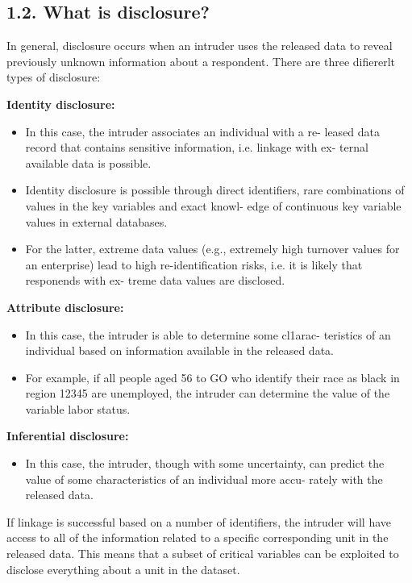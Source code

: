 \documentclass[]{article}
\begin{document}
\subsection*{1.2. What is disclosure?}
In general, disclosure occurs when an intruder uses the released data to reveal
previously unknown information about a respondent. There are three diﬁererlt
types of disclosure:


	\textbf{Identity disclosure:}
	\begin{itemize}
\item In this case, the intruder associates an individual with a re-
leased data record that contains sensitive information, i.e. linkage with ex-
ternal available data is possible.
\item Identity disclosure is possible through direct
identiﬁers, rare combinations of values in the key variables and exact knowl-
edge of continuous key variable values in external databases. 
\item For the latter,
extreme data values (e.g., extremely high turnover values for an enterprise)
lead to high re-identiﬁcation risks, i.e. it is likely that responends with ex-
treme data values are disclosed.
\end{itemize}
\newpage
\textbf{Attribute disclosure:}
\begin{itemize}
	
	\item In this case, the intruder is able to determine some cl1arac-
teristics of an individual based on information available in the released data.
\item For example, if all people aged 56 to GO who identify their race as black in
region 12345 are unemployed, the intruder can determine the value of the
variable labor status.
\end{itemize}

\textbf{Inferential disclosure:}
\begin{itemize}
	
\item In this case, the intruder, though with some uncertainty,
can predict the value of some characteristics of an individual more accu-
rately with the released data.
\end{itemize}
\newpage
If linkage is successful based on a number of identiﬁers, the intruder will have
access to all of the information related to a speciﬁc corresponding unit in the
released data. This means that a subset of critical variables can be exploited to
disclose everything about a unit in the dataset.
\end{document}
